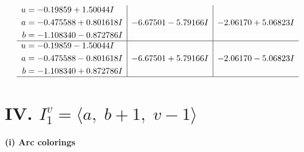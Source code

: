 \documentclass[1p]{elsarticle_modified}
\theoremstyle{definition}
\begin{document}
$$\begin{array}{c|c|c}
\begin{aligned}
u &= -0.19859 + 1.50044 I \\
a &= -0.475588 + 0.801618 I \\
b &= -1.108340 - 0.872786 I\end{aligned}
 & -6.67501 - 5.79166 I & -2.06170 + 5.06823 I \\ \hline\begin{aligned}
u &= -0.19859 - 1.50044 I \\
a &= -0.475588 - 0.801618 I \\
b &= -1.108340 + 0.872786 I\end{aligned}
 & -6.67501 + 5.79166 I & -2.06170 - 5.06823 I\\
 \hline 
 \end{array}$$\newpage\newpage\renewcommand{\arraystretch}{1}
\centering \section*{IV. $I^v_{1}= \langle a,\;b+1,\;v-1 \rangle$}
\flushleft \textbf{(i) Arc colorings}\\
\end{document}
